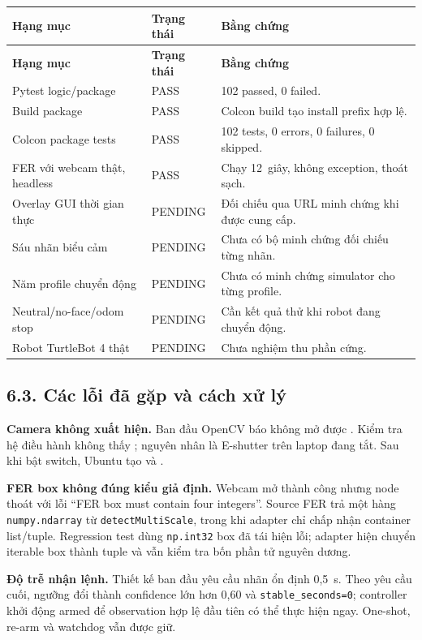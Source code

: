 \begin{longtable}{@{}p{}p{}p{}@{}}
\toprule \textbf{Hạng mục} & \textbf{Trạng thái} & \textbf{Bằng chứng} \\ \midrule
\endfirsthead
\toprule \textbf{Hạng mục} & \textbf{Trạng thái} & \textbf{Bằng chứng} \\ \midrule
\endhead
Pytest logic/package & PASS & 102 passed, 0 failed. \\
Build package & PASS & Colcon build tạo install prefix hợp lệ. \\
Colcon package tests & PASS & 102 tests, 0 errors, 0 failures, 0 skipped. \\
FER với webcam thật, headless & PASS & Chạy 12~giây, không exception, thoát sạch. \\
Overlay GUI thời gian thực & PENDING & Đối chiếu qua URL minh chứng khi được cung cấp. \\
Sáu nhãn biểu cảm & PENDING & Chưa có bộ minh chứng đối chiếu từng nhãn. \\
Năm profile chuyển động & PENDING & Chưa có minh chứng simulator cho từng profile. \\
Neutral/no-face/odom stop & PENDING & Cần kết quả thử khi robot đang chuyển động. \\
Robot TurtleBot 4 thật & PENDING & Chưa nghiệm thu phần cứng. \\
\bottomrule
\end{longtable}

\subsection*{6.3. Các lỗi đã gặp và cách xử lý}

\textbf{Camera không xuất hiện.} Ban đầu OpenCV báo không mở được
. Kiểm tra hệ điều hành không thấy ; nguyên
nhân là E-shutter trên laptop đang tắt. Sau khi bật switch, Ubuntu tạo
 và .

\textbf{FER box không đúng kiểu giả định.} Webcam mở thành công nhưng node
thoát với lỗi ``FER box must contain four integers''. Source FER trả một hàng
\texttt{numpy.ndarray} từ \texttt{detectMultiScale}, trong khi adapter chỉ
chấp nhận container list/tuple. Regression test dùng \texttt{np.int32} box đã
tái hiện lỗi; adapter hiện chuyển iterable box thành tuple và vẫn kiểm tra bốn
phần tử nguyên dương.

\textbf{Độ trễ nhận lệnh.} Thiết kế ban đầu yêu cầu nhãn ổn định 0,5~s. Theo
yêu cầu cuối, ngưỡng đổi thành confidence lớn hơn 0,60 và
\texttt{stable\_seconds=0}; controller khởi động armed để observation hợp lệ
đầu tiên có thể thực hiện ngay. One-shot, re-arm và watchdog vẫn được giữ.

